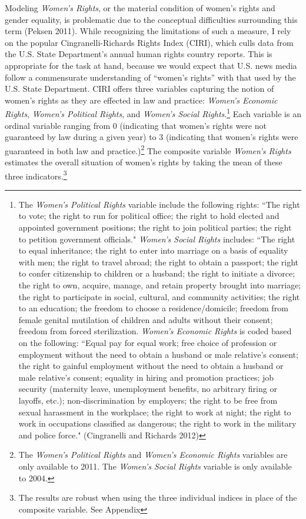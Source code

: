 \documentclass[11pt, oneside]{article}
\begin{document}
Modeling \emph{Women's Rights}, or the material condition of women's rights and gender equality, is problematic due to the conceptual difficulties surrounding this term (Peksen 2011). While recognizing the limitations of such a measure, I rely on the popular Cingranelli-Richards Rights Index (CIRI), which culls data from the U.S. State Department's annual human rights country reports. This is appropriate for the task at hand, because we would expect that U.S. news media follow a commensurate understanding of ``women's rights'' with that used by the U.S. State Department. CIRI offers three variables capturing the notion of women's rights as they are effected in law and practice: \emph{Women's Economic Rights}, \emph{Women's Political Rights}, and \emph{Women's Social Rights}.\footnote{\hspace{5}The \emph{Women's Political Rights} variable include the following rights: ``The right to vote; the right to run for political office; the right to hold elected and appointed government positions; the right to join political parties; the right to petition government officials." \emph{Women's Social Rights} includes: ``The right to equal inheritance; the right to enter into marriage on a basis of equality with men; the right to travel abroad; the right to obtain a passport; the right to confer citizenship to children or a husband; the right to initiate a divorce; the right to own, acquire, manage, and retain property brought into marriage; the right to participate in social, cultural, and community activities; the right to an education; the freedom to choose a residence/domicile; freedom from female genital mutilation of children and adults without their consent; freedom from forced sterilization. \emph{Women's Economic Rights} is coded based on the following: ``Equal pay for equal work; free choice of profession or employment without the need to obtain a husband or male relative's consent; the right to gainful employment without the need to obtain a husband or male relative's consent; equality in hiring and promotion practices; job security (maternity leave, unemployment benefits, no arbitrary firing or layoffs, etc.); non-discrimination by employers; the right to be free from sexual harassment in the workplace; the right to work at night; the right to work in occupations classified as dangerous; the right to work in the military and police force."  (Cingranelli and Richards 2012)}  Each variable is an ordinal variable ranging from 0 (indicating that women's rights were not guaranteed by law during a given year) to 3 (indicating that women's rights were guaranteed in both law and practice.)\footnote{\hspace{5}The \emph{Women's Political Rights} and \emph{Women's Economic Rights} variables are only available to 2011. The \emph{Women's Social Rights} variable is only available to 2004.} The composite variable \emph{Women's Rights} estimates the overall situation of women's rights by taking the mean of these three indicators.\footnote{\hspace{3} The results are robust when using the three individual indices in place of the composite variable. See Appendix}  
\end{document}
